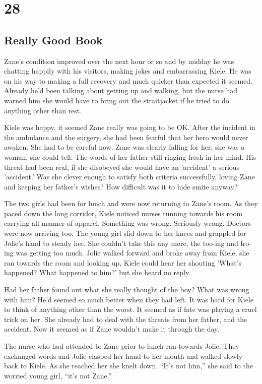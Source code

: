 \chapter{28}
\section{Really Good Book}


Zane's condition improved over the next hour or so and by midday he was chatting happily with his visitors, making jokes and embarrassing Kiele.  He was on his way to making a full recovery and much quicker than expected it seemed.  Already he'd been talking about getting up and walking, but the nurse had warned him she would have to bring out the straitjacket if he tried to do anything other than rest.

Kiele was happy, it seemed Zane really was going to be OK.  After the incident in the ambulance and the surgery, she had been fearful that her hero would never awaken.  She had to be careful now.  Zane was clearly falling for her, she was a woman, she could tell.  The words of her father still ringing fresh in her mind.  His threat had been real, if she disobeyed she would have an 'accident' a serious 'accident.'  Was she clever enough to satisfy both criteria successfully, loving Zane and keeping her father's wishes?  How difficult was it to hide smite anyway?

The two girls had been for lunch and were now returning to Zane's room.  As they paced down the long corridor, Kiele noticed nurses running towards his room carrying all manner of apparel.  Something was wrong.  Seriously wrong.  Doctors were now arriving too.  The young girl slid down to her knees and grappled for Jolie's hand to steady her.  She couldn't take this any more, the too-ing and fro-ing was getting too much.  Jolie walked forward and broke away from Kiele, she ran towards the room and looking up, Kiele could hear her shouting 'What's happened?  What happened to him?' but she heard no reply.  

Had her father found out what she really thought of the boy?  What was wrong with him?  He'd seemed so much better when they had left.  It was hard for Kiele to think of anything other than the worst.  It seemed as if fate was playing a cruel trick on her.  She already had to deal with the threats from her father, and the accident.  Now it seemed as if Zane wouldn't make it through the day.

The nurse who had attended to Zane prior to lunch ran towards Jolie.  They exchanged words and Jolie clasped her hand to her mouth and walked slowly back to Kiele.  As she reached her she knelt down.  ``It's not him,'' she said to the worried young girl, ``it's not Zane.''  

